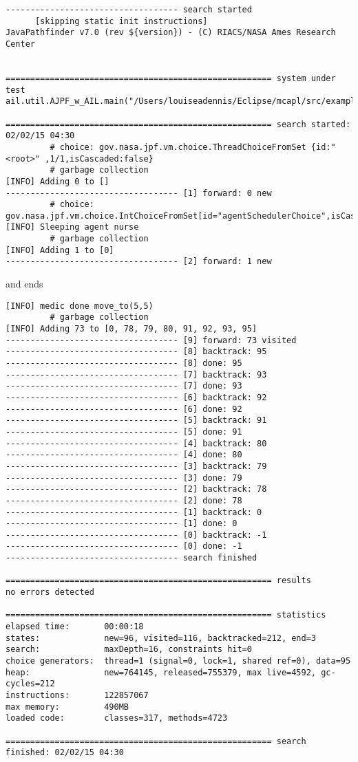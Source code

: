 \documentclass[a4]{article}
\begin{document}
\begin{verbatim}
----------------------------------- search started
      [skipping static init instructions]
JavaPathfinder v7.0 (rev ${version}) - (C) RIACS/NASA Ames Research Center


====================================================== system under test
ail.util.AJPF_w_AIL.main("/Users/louiseadennis/Eclipse/mcapl/src/examples/gwendolen/ail_tutorials/tutorial1/answers/ex2.ail","/Users/louiseadennis/Eclipse/mcapl/src/examples/gwendolen/ajpf_tutorials/tutorial1/lifterandmedic.psl","1")

====================================================== search started: 02/02/15 04:30
		 # choice: gov.nasa.jpf.vm.choice.ThreadChoiceFromSet {id:"<root>" ,1/1,isCascaded:false}
		 # garbage collection
[INFO] Adding 0 to []
----------------------------------- [1] forward: 0 new
		 # choice: gov.nasa.jpf.vm.choice.IntChoiceFromSet[id="agentSchedulerChoice",isCascaded:false,>0,1,2]
[INFO] Sleeping agent nurse
		 # garbage collection
[INFO] Adding 1 to [0]
----------------------------------- [2] forward: 1 new
\end{verbatim}

and ends

\begin{verbatim}
[INFO] medic done move_to(5,5)
		 # garbage collection
[INFO] Adding 73 to [0, 78, 79, 80, 91, 92, 93, 95]
----------------------------------- [9] forward: 73 visited
----------------------------------- [8] backtrack: 95
----------------------------------- [8] done: 95
----------------------------------- [7] backtrack: 93
----------------------------------- [7] done: 93
----------------------------------- [6] backtrack: 92
----------------------------------- [6] done: 92
----------------------------------- [5] backtrack: 91
----------------------------------- [5] done: 91
----------------------------------- [4] backtrack: 80
----------------------------------- [4] done: 80
----------------------------------- [3] backtrack: 79
----------------------------------- [3] done: 79
----------------------------------- [2] backtrack: 78
----------------------------------- [2] done: 78
----------------------------------- [1] backtrack: 0
----------------------------------- [1] done: 0
----------------------------------- [0] backtrack: -1
----------------------------------- [0] done: -1
----------------------------------- search finished

====================================================== results
no errors detected

====================================================== statistics
elapsed time:       00:00:18
states:             new=96, visited=116, backtracked=212, end=3
search:             maxDepth=16, constraints hit=0
choice generators:  thread=1 (signal=0, lock=1, shared ref=0), data=95
heap:               new=764145, released=755379, max live=4592, gc-cycles=212
instructions:       122857067
max memory:         490MB
loaded code:        classes=317, methods=4723

====================================================== search finished: 02/02/15 04:30
\end{verbatim}
\end{document}

